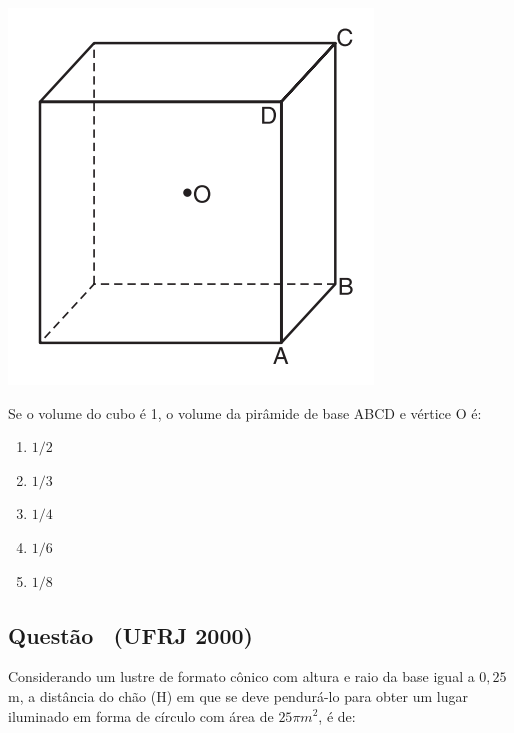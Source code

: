 \documentclass[12pt]{article}
\newcounter{questao}
\newcommand{\novaquestao}[1]{%
  \stepcounter{questao}%
  \subsection*{Questão \thequestao\ (#1)}%
}
\begin{document}
\begin{multicols}{2}
            \begin{center}
                \includegraphics[scale=0.6]{qUFRS.png}
            \end{center} Se o volume do cubo é 1, o volume da pirâmide de base ABCD e vértice O é:
            
            \begin{enumerate}[label=(\alph*), noitemsep]
                \item ${1}/{2}$
                \item ${1}/{3}$
                \item ${1}/{4}$ 
                \item {${1}/{6}$} %
                \item ${1}/{8}$
            \end{enumerate}
        
        \novaquestao{UFRJ 2000}
            Considerando um lustre de formato cônico com altura e raio da base igual a $0,25$ m, a distância do chão (H) em que se deve pendurá-lo para obter um lugar iluminado em forma de círculo com área de $25\pi m^{2}$, é de:


\end{multicols}
\end{document}
